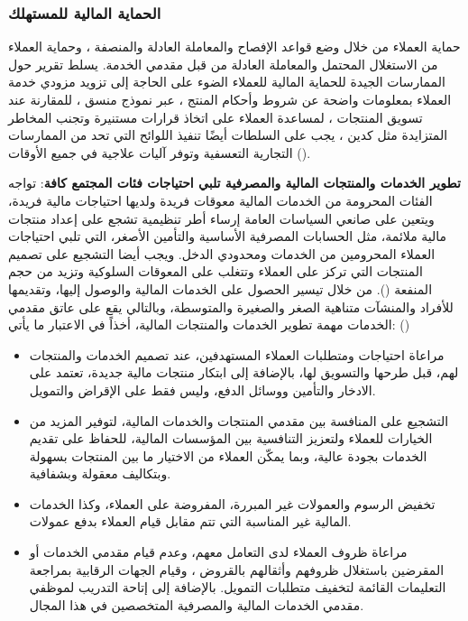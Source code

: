 \documentclass[10pt,a4paper]{report}
\begin{document}
\begin{doublespacing}
\subsubsection{الحماية المالية للمستهلك}
حماية العملاء من خلال وضع قواعد الإفصاح والمعاملة العادلة والمنصفة ، وحماية العملاء من الاستغلال المحتمل والمعاملة العادلة من قبل مقدمي الخدمة. يسلط تقرير  حول الممارسات الجيدة للحماية المالية للعملاء الضوء على الحاجة إلى تزويد مزودي خدمة العملاء بمعلومات واضحة عن شروط وأحكام المنتج ، عبر نموذج منسق ، للمقارنة عند تسويق المنتجات ، لمساعدة العملاء على اتخاذ قرارات مستنيرة وتجنب المخاطر المتزايدة مثل كدين ، يجب على السلطات أيضًا تنفيذ اللوائح التي تحد من الممارسات التجارية التعسفية وتوفر آليات علاجية في جميع الأوقات ().

\textbf{تطوير الخدمات والمنتجات المالية والمصرفية تلبي احتياجات فئات المجتمع كافة}: 
تواجه الفئات المحرومة من الخدمات المالية معوقات فريدة ولديها احتياجات مالية فريدة، ويتعين على صانعي السياسات العامة إرساء أطر تنظيمية تشجع على إعداد منتجات مالية ملائمة، مثل الحسابات المصرفية الأساسية والتأمين الأصغر، التي تلبي احتياجات العملاء المحرومين من الخدمات ومحدودي الدخل. ويجب أيضا التشجيع على تصميم المنتجات التي تركز على العملاء وتتغلب على المعوقات السلوكية وتزيد من حجم المنفعة (). من خلال تيسير الحصول على الخدمات المالية والوصول إليها، وتقديمها للأفراد والمنشآت متناهية الصغر والصغيرة والمتوسطة، وبالتالي يقع على عاتق مقدمي الخدمات مهمة تطوير الخدمات والمنتجات المالية، أخذاً في الاعتبار ما يأتي: ()

\begin{itemize}
	\item مراعاة احتياجات ومتطلبات العملاء المستهدفين، عند تصميم الخدمات والمنتجات لهم، قبل طرحها والتسويق لها، بالإضافة إلى ابتكار منتجات مالية جديدة، تعتمد على الادخار والتأمين ووسائل الدفع، وليس فقط على الإقراض والتمويل.
	\item التشجيع على المنافسة بين مقدمي المنتجات والخدمات المالية، لتوفير المزيد من الخيارات للعملاء ولتعزيز التنافسية بين المؤسسات المالية، للحفاظ على تقديم الخدمات بجودة عالية، وبما يمكّن العملاء من الاختيار ما بين المنتجات بسهولة وبتكاليف معقولة وبشفافية.
	\item تخفيض الرسوم والعمولات غير المبررة، المفروضة على العملاء، وكذا الخدمات المالية غير المناسبة التي تتم مقابل قيام العملاء بدفع عمولات.
	\item مراعاة ظروف العملاء لدى التعامل معهم، وعدم قيام مقدمي الخدمات أو المقرضين باستغلال ظروفهم وأثقالهم بالقروض ، وقيام الجهات الرقابية بمراجعة التعليمات القائمة لتخفيف متطلبات التمويل. بالإضافة إلى إتاحة التدريب لموظفي مقدمي الخدمات المالية والمصرفية المتخصصين في هذا المجال.
\end{itemize}

\end{doublespacing}
\end{document}
